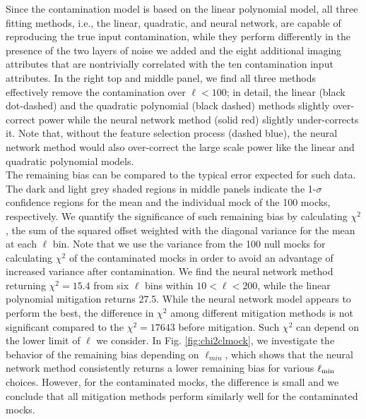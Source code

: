 \documentclass[fleqn, usenatbib]{mnras}
\begin{document}
Since the contamination model is based on the linear polynomial model, all three fitting methods, i.e., the linear, quadratic, and neural network, are capable of reproducing the true input contamination, while they perform differently in the presence of the two layers of noise we added and the eight additional imaging attributes that are nontrivially correlated with the ten contamination input attributes. In the right top and middle panel, we find all three methods effectively remove the contamination over $\ell <100$; in detail, the linear (black dot-dashed) and the quadratic polynomial (black dashed) methods slightly over-correct power while the neural network method (solid red) slightly under-corrects it. Note that, without the feature selection process (dashed blue), the neural network method would also over-correct the large scale power like the linear and quadratic polynomial models.\\

The remaining bias can be compared to the typical error expected for such data. The dark and light grey shaded regions in middle panels indicate the 1-$\sigma$ confidence regions for the mean and the individual mock of the 100 mocks, respectively.  We quantify the significance of such remaining bias by calculating $\chi^2$, the sum of the squared offset weighted with the diagonal variance for the mean at each $\ell$ bin. Note that we use the variance from the 100 null mocks for calculating $\chi^2$ of the contaminated mocks in order to avoid an advantage of increased variance after contamination. We find the neural network method returning $\chi^2=15.4$ from six $\ell$ bins within $10<\ell <200$, while the linear polynomial mitigation returns 27.5. While the neural network model appears to perform the best, the difference in $\chi^2$ among different mitigation methods is not significant compared to the $\chi^2=17643$ before mitigation. 
 Such $\chi^2$ can depend on the lower limit of $\ell$ we consider. In Fig. \ref{fig:chi2clmock}, we investigate the behavior of the remaining bias depending on $\ell_{min}$, which shows that the neural network method consistently returns a lower remaining bias for various $\ell_{\rm min}$ choices. However, for the contaminated mocks, the difference is small and we conclude that all mitigation methods perform similarly well for the contaminated mocks. \\
\end{document}
